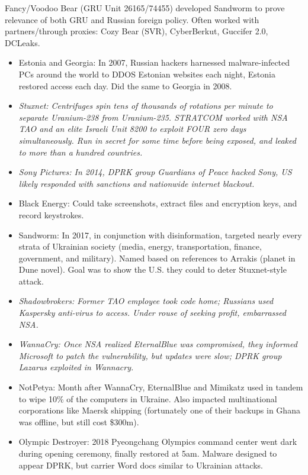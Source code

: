 \documentclass[
]{article}
\begin{document}
Fancy/Voodoo Bear (GRU Unit 26165/74455) developed Sandworm to prove
relevance of both GRU and Russian foreign policy. Often worked with
partners/through proxies: Cozy Bear (SVR), CyberBerkut, Guccifer 2.0,
DCLeaks.

\begin{itemize}
\item
  Estonia and Georgia: In 2007, Russian hackers harnessed
  malware-infected PCs around the world to DDOS Estonian websites each
  night, Estonia restored access each day. Did the same to Georgia in
  2008.
\item
  \emph{Stuxnet: Centrifuges spin tens of thousands of rotations per
  minute to separate Uranium-238 from Uranium-235. STRATCOM worked with
  NSA TAO and an elite Israeli Unit 8200 to exploit FOUR zero days
  simultaneously. Run in secret for some time before being exposed, and
  leaked to more than a hundred countries.}
\item
  \emph{Sony Pictures: In 2014, DPRK group Guardians of Peace hacked
  Sony, US likely responded with sanctions and nationwide internet
  blackout.}
\item
  Black Energy: Could take screenshots, extract files and encryption
  keys, and record keystrokes.
\item
  Sandworm: In 2017, in conjunction with disinformation, targeted nearly
  every strata of Ukrainian society (media, energy, transportation,
  finance, government, and military). Named based on references to
  Arrakis (planet in Dune novel). Goal was to show the U.S. they could
  to deter Stuxnet-style attack.
\item
  \emph{Shadowbrokers: Former TAO employee took code home; Russians used
  Kaspersky anti-virus to access. Under rouse of seeking profit,
  embarrassed NSA.}
\item
  \emph{WannaCry: Once NSA realized EternalBlue was compromised, they
  informed Microsoft to patch the vulnerability, but updates were slow;
  DPRK group Lazarus exploited in Wannacry.}
\item
  NotPetya: Month after WannaCry, EternalBlue and Mimikatz used in
  tandem to wipe 10\% of the computers in Ukraine. Also impacted
  multinational corporations like Maersk shipping (fortunately one of
  their backups in Ghana was offline, but still cost \$300m).
\item
  Olympic Destroyer: 2018 Pyeongchang Olympics command center went dark
  during opening ceremony, finally restored at 5am. Malware designed to
  appear DPRK, but carrier Word docs similar to Ukrainian attacks.
\end{itemize}
\end{document}

